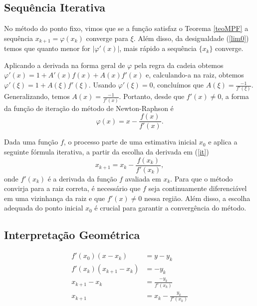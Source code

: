 \subsection{Sequência Iterativa} 
No método do ponto fixo, vimos que se a função satisfaz o Teorema \ref{teoMPF} a sequência $x_{k+1} = \varphi(x_k)$ converge para $\xi$. Além disso, da desigualdade (\ref{lim0}) temos que quanto menor for $|\varphi'(x)|$, mais rápido a sequência $\{x_k\}$ converge.

Aplicando a derivada na forma geral de $\varphi$ pela regra da cadeia obtemos $\varphi'(x) = 1 + A'(x)f(x) + A(x)f'(x)$ e, calculando-a na raiz, obtemos $\varphi'(\xi) = 1 + A(\xi)f'(\xi)$. Usando $\varphi'(\xi) = 0$, concluímos que $A(\xi) = \frac{-1}{f'(\xi)}$. Generalizando, temos $A(x) = \frac{-1}{f'(x)}$. Portanto, desde que $f'(x) \neq 0$, a forma da função de iteração do método de Newton-Raphson é 
\begin{equation} \label{phiNR1d}
    \varphi(x) = x - \frac{f(x)}{f'(x)}.
\end{equation}

Dada uma função \(f\), o processo parte de uma estimativa inicial \(x_0\) e aplica a seguinte fórmula iterativa, a partir da escolha da derivada em (\ref{it})
\begin{equation} \label{nr}
    x_{k+1} = x_k - \frac{f(x_k)}{f'(x_k)},
\end{equation}
onde \(f'(x_k)\) é a derivada da função \(f\) avaliada em \(x_k\).
Para que o método convirja para a raiz correta, é necessário que \(f\) seja continuamente diferenciável em uma vizinhança da raiz e que \(f'(x) \neq 0\) nessa região. Além disso, a escolha adequada do ponto inicial \(x_0\) é crucial para garantir a convergência do método.

\subsection{Interpretação Geométrica}
\begin{align*}
    f'(x_0)(x - x_k) &= y - y_k \\
    f'(x_k)(x_{k+1} - x_k) &= -y_k \\
    x_{k+1} - x_k &= \frac{-y_k}{f'(x_k)} \\
    x_{k+1} &= x_k - \frac{y_k}{f'(x_k)}
\end{align*}
